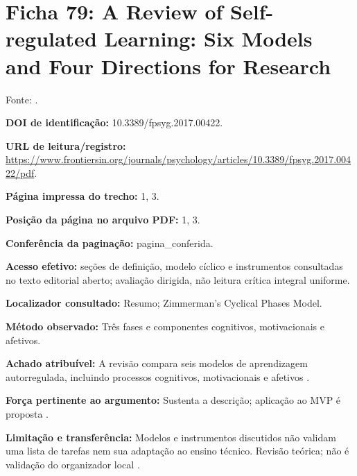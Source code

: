 \clearpage\section*{Ficha 79: A Review of Self-regulated Learning: Six Models and Four Directions for Research}

Fonte: \citet[p. 1, 3]{SU10}.

\noindent\textbf{DOI de identificação:} 10.3389/fpsyg.2017.00422.\par\medskip

\noindent\textbf{URL de leitura/registro:} \url{https://www.frontiersin.org/journals/psychology/articles/10.3389/fpsyg.2017.00422/pdf}.\par\medskip

\noindent\textbf{Página impressa do trecho:} 1, 3.\par\medskip

\noindent\textbf{Posição da página no arquivo PDF:} 1, 3.\par\medskip

\noindent\textbf{Conferência da paginação:} pagina\_conferida.\par\medskip

\noindent\textbf{Acesso efetivo:} seções de definição, modelo cíclico e instrumentos consultadas no texto editorial aberto; avaliação dirigida, não leitura crítica integral uniforme.\par\medskip

\noindent\textbf{Localizador consultado:} Resumo; Zimmerman’s Cyclical Phases Model.\par\medskip

\noindent\textbf{Método observado:} Três fases e componentes cognitivos, motivacionais e afetivos.\par\medskip

\noindent\textbf{Achado atribuível:} A revisão compara seis modelos de aprendizagem autorregulada, incluindo processos cognitivos, motivacionais e afetivos \citep[p. 1, 3]{SU10}.\par\medskip

\noindent\textbf{Força pertinente ao argumento:} Sustenta a descrição; aplicação ao MVP é proposta \citep[p. 1, 3]{SU10}.\par\medskip

\noindent\textbf{Limitação e transferência:} Modelos e instrumentos discutidos não validam uma lista de tarefas nem sua adaptação ao ensino técnico. Revisão teórica; não é validação do organizador local \citep[p. 1, 3]{SU10}.\par\medskip

